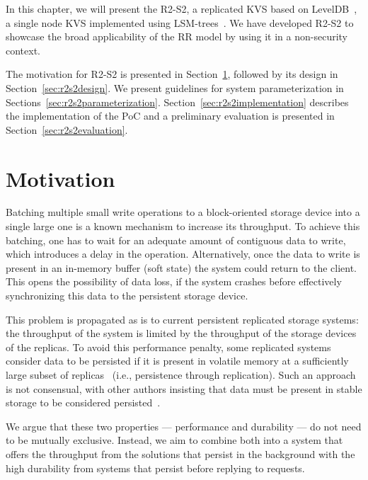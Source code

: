 \label{chap:storage}
\cleardoublepage{}

In this chapter, we will present the \acf{R2-S2}, a replicated
\ac{KVS} based on LevelDB~\cite{leveldb}, a single node \ac{KVS}
implemented using  \acp{LSM-tree}~\cite{lsm}. We have developed
\ac{R2-S2} to showcase the broad applicability of the \ac{RR}
model by using it in a non-security context.

The motivation for \ac{R2-S2} is presented in
Section~\ref{sec:r2s2motivation}, followed by its design in
Section~\ref{sec:r2s2design}. We present guidelines for system
parameterization in Sections~\ref{sec:r2s2parameterization}.
Section~\ref{sec:r2s2implementation} describes the implementation
of the PoC and a preliminary evaluation is presented in
Section~\ref{sec:r2s2evaluation}.

\section{Motivation}\label{sec:r2s2motivation}
Batching multiple small write operations to a block-oriented storage device into a
single large one is a known mechanism to increase its throughput.
To achieve this batching, one has to wait for an adequate amount
of contiguous data to write, which introduces a delay in the
operation. Alternatively, once the data to write is present in
an in-memory buffer (soft state) the system could return to the
client. This opens the possibility of data loss, if the system
crashes before effectively synchronizing this data to the persistent
storage device.

%
This problem is propagated as is to current persistent replicated storage
systems: the throughput of the system is limited by the
throughput of the storage devices of the replicas. To avoid this
performance penalty, some replicated systems consider data to be persisted if it is
present in volatile memory at a sufficiently large subset of replicas~\cite{pbft}
(i.e., persistence through replication). Such an approach is not
consensual, with other authors insisting that data must be
present in stable storage to be considered
persisted~\cite{bolosky:paxos}.

We argue that these two properties --- performance and
durability --- do not need to be mutually exclusive. Instead, we
aim to combine both into a system that offers the throughput from
the solutions that persist in the background with the high
durability from systems that persist before replying to
requests.


